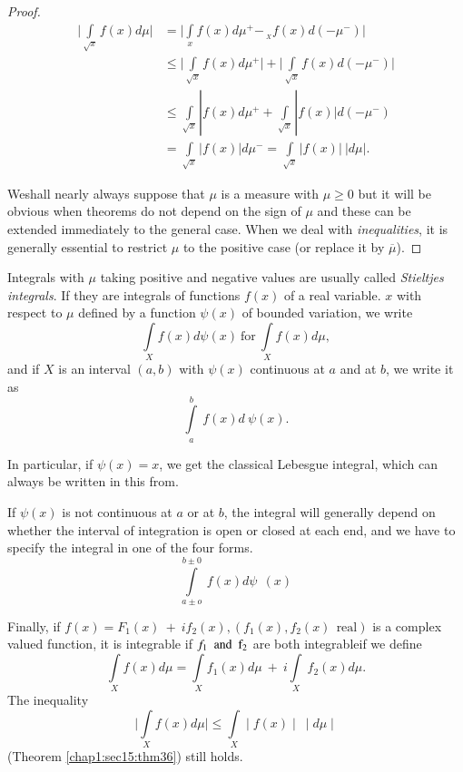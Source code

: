 \begin{proof}
  \begin{align*}
    \bigg|\int\limits_{\sqrt{x}}f(x)d\mu\bigg| & = \bigg| \int\limits_{x} f(x)d
    \mu^+ -_{{~}_{X}}  f(x)d (-\mu ^-)\bigg|\\ 
    & \leq  \bigg| \int\limits_{\sqrt{x}} f(x)d
    \mu^+\bigg|+\bigg|\int\limits_{\sqrt{x}} f(x) d(-\mu^-)\bigg| \\ 
    & \leq  \int\limits_{\sqrt{x}}|f (x)d \mu ^+ +
    \int\limits_{\sqrt{x}}|f(x)| d(-\mu^-)\\ 
    & = \int\limits_{\sqrt{x}} |f(x)|d \mu^- = \int\limits_{\sqrt{x}}
    | f(x)|~|d \mu |. 
  \end{align*}

  We\pageoriginale shall nearly always suppose that $\mu$ is a measure with 
  $\mu \ge 0$ but it will be obvious when theorems do not depend on the
  sign of $\mu$ and these can be extended immediately to the general case.
  When we deal with \textit{inequalities}, it is generally essential to restrict
  $\mu$ to the positive case (or replace it by $\overline \mu$).
\end{proof}

Integrals with $\mu$ taking positive and negative values are
usually called \textit{Stieltjes integrals}. If they are integrals of functions 
$f(x)$ of a real variable. $x$ with respect to $\mu$ defined by a function 
$ \psi (x)$ of bounded variation, we write
$$ 
\int\limits_X  f(x) d \psi (x) ~\text{for}~ \int\limits_X f(x) d \mu, 
$$
and if $X$ is an interval $(a,b)$ with $\psi(x)$ continuous at $a$ and at $b$,
we write it as 
$$ 
\int\limits^b_a ~ f(x)d ~ \psi (x). 
$$

In particular, if $\psi (x) = x$, we get the classical Lebesgue integral,
which can always be written in this from.

If $\psi(x)$ is not continuous at $a$ or at $b$, the integral will
generally depend on whether the interval of integration is open or
closed at each end, and we have to specify the integral in one of the
four forms.
$$ 
\int\limits^{b \pm 0}_{a \pm o} ~f(x)d \psi~~ (x) 
$$ 

Finally, if $f(x) =  F_1(x)~ + ~if_2(x), (f_1(x), f_2(x)
~~\text{real})$ is a  complex valued function, it is integrable if $
f_1 ~~ \rm and ~~ f_2 $ are both integrable\pageoriginale if we define
$$ 
\int\limits_{X}  f(x)d \mu =  \int\limits_{X}  f_1(x) d \mu ~ +~ i
          \int\limits_{X} ~ f_2(x) d \mu. 
$$
The inequality
$$
\bigg|\int\limits_{X} f(x)d \mu \bigg| \le \int\limits_{X}\mid
f(x)\mid ~\mid d \mu \mid 
$$
(Theorem \ref{chap1:sec15:thm36}) still holds.

